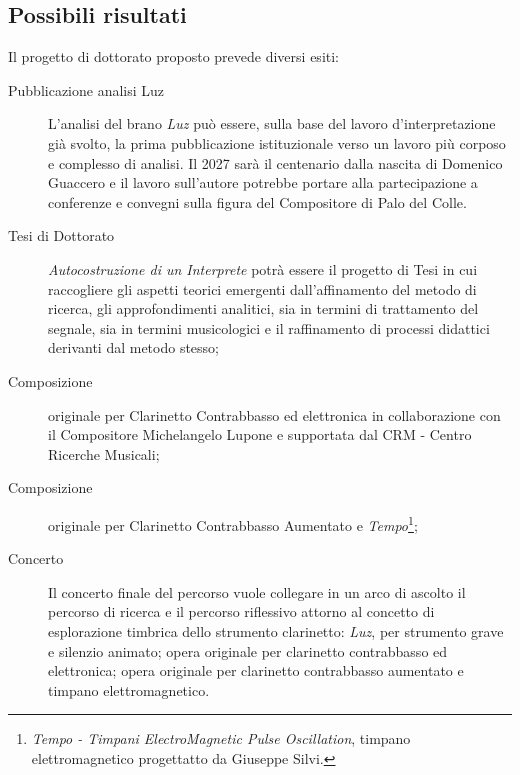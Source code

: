 \documentclass{gs-adonis}
\begin{document}

\subsection{Possibili risultati}%


Il progetto di dottorato proposto prevede diversi esiti:

\begin{description}
  \item[Pubblicazione analisi Luz] L'analisi del brano \emph{Luz} può essere,
    sulla base del lavoro d'interpretazione già svolto, la prima pubblicazione
    istituzionale verso un lavoro più corposo e complesso di analisi. Il 2027
    sarà il centenario dalla nascita di Domenico Guaccero e il lavoro
    sull'autore potrebbe portare alla partecipazione a conferenze e convegni
    sulla figura del Compositore di Palo del Colle.
  \item[Tesi di Dottorato] \emph{Autocostruzione di un Interprete} potrà essere il
    progetto di Tesi in cui raccogliere gli aspetti teorici emergenti
    dall'affinamento del metodo di ricerca, gli approfondimenti analitici, sia
    in termini di trattamento del segnale, sia in termini musicologici e il
    raffinamento di processi didattici derivanti dal metodo stesso;
  \item[Composizione] originale per Clarinetto Contrabbasso ed elettronica in
    collaborazione con il Compositore Michelangelo Lupone e supportata dal
    CRM - Centro Ricerche Musicali;
  \item[Composizione] originale per Clarinetto Contrabbasso Aumentato e
    \emph{Tempo}\footnote{%
  \emph{Tempo - Timpani ElectroMagnetic Pulse Oscillation}, timpano
  elettromagnetico progettatto da Giuseppe Silvi.
  };
  \item[Concerto] Il concerto finale del percorso vuole collegare in un arco di
    ascolto il percorso di ricerca e il percorso riflessivo attorno al concetto di
    esplorazione timbrica dello strumento clarinetto: \emph{Luz}, per strumento
    grave e silenzio animato; opera originale per clarinetto contrabbasso ed
    elettronica; opera originale per clarinetto contrabbasso aumentato e timpano
    elettromagnetico.
\end{description}
\end{document}
